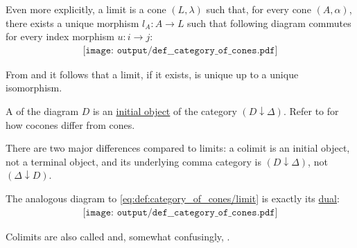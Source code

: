 \begin{definition}
\begin{thmenum}
    Even more explicitly, a limit is a cone \( (L, \lambda) \) such that, for every cone \( (A, \alpha) \), there exists a unique morphism \( l_A: A \to L \) such that following diagram commutes for every index morphism \( u: i \to j \):
    \begin{equation}\label{eq:def:category_of_cones/limit}
      \begin{aligned}
        \texttt{[image: output/def\_\_category\_of\_cones.pdf]}
      \end{aligned}
    \end{equation}

    From  and  it follows that a limit, if it exists, is unique up to a unique isomorphism.

     A  of the diagram \( D \) is an \hyperref[def:universal_objects/initial]{initial object} of the  category \( (D \downarrow \Delta) \). Refer to  for how cocones differ from cones.

    There are two major differences compared to limits: a colimit is an initial object, not a terminal object, and its underlying comma category is \( (D \downarrow \Delta) \), not \( (\Delta \downarrow D) \).

    The analogous diagram to \eqref{eq:def:category_of_cones/limit} is exactly its \hyperref[rem:categorical_principle_of_duality]{dual}:
    \begin{equation}\label{eq:def:category_of_cones/colimit}
      \begin{aligned}
        \texttt{[image: output/def\_\_category\_of\_cones.pdf]}
      \end{aligned}
    \end{equation}

    Colimits are also called  and, somewhat confusingly, .
  \end{thmenum}
\end{definition}
